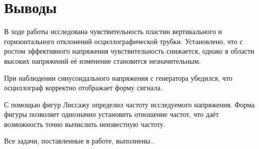 \section{Выводы}
В ходе работы исследована чувствительность пластин вертикального и горизонтального отклонений осциллографической трубки. Установлено, что с ростом эффективного напряжения чувствительность снижается, однако в области высоких напряжений её изменение становится незначительным.

При наблюдении синусоидального напряжения с генератора убедился, что осциллограф корректно отображает форму сигнала.

С помощью фигур Лиссажу определил частоту исследуемого напряжения. Форма фигуры позволяет однозначно установить отношение частот, что даёт возможность точно вычислить неизвестную частоту.

Все задачи, поставленные в работе, выполнены..
